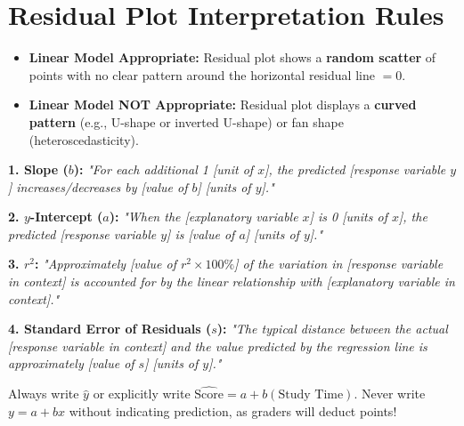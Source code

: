 \section{Residual Plot Interpretation Rules}

\begin{itemize}
    \item \textbf{Linear Model Appropriate:} Residual plot shows a \textbf{random scatter} of points with no clear pattern around the horizontal residual line $= 0$.
    \item \textbf{Linear Model NOT Appropriate:} Residual plot displays a \textbf{curved pattern} (e.g., U-shape or inverted U-shape) or fan shape (heteroscedasticity).
\end{itemize}

\begin{templatebox}
\textbf{1. Slope ($b$):} \emph{"For each additional 1 [unit of $x$], the predicted [response variable $y$] increases/decreases by [value of $b$] [units of $y$]."}

\textbf{2. $y$-Intercept ($a$):} \emph{"When the [explanatory variable $x$] is 0 [units of $x$], the predicted [response variable $y$] is [value of $a$] [units of $y$]."}

\textbf{3. $r^2$:} \emph{"Approximately [value of $r^2 \times 100\%$] of the variation in [response variable in context] is accounted for by the linear relationship with [explanatory variable in context]."}

\textbf{4. Standard Error of Residuals ($s$):} \emph{"The typical distance between the actual [response variable in context] and the value predicted by the regression line is approximately [value of $s$] [units of $y$]."}
\end{templatebox}

\begin{trapbox}
Always write $\hat{y}$ or explicitly write $\widehat{\text{Score}} = a + b(\text{Study Time})$. Never write $y = a + bx$ without indicating prediction, as graders will deduct points!
\end{trapbox}
